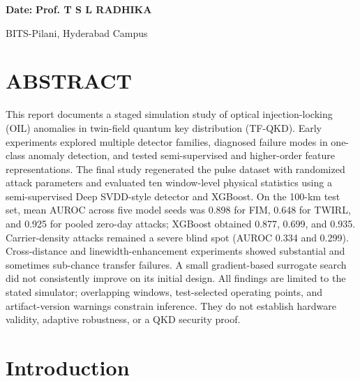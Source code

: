 \documentclass[12pt, a4paper]{report}
\begin{document}
\vspace{4cm}

\noindent \textbf{Date:} \hfill \textbf{Prof. T S L RADHIKA}

\vspace{2cm}

\noindent BITS-Pilani, Hyderabad Campus

\chapter*{ABSTRACT}

This report documents a staged simulation study of optical injection-locking (OIL) anomalies in twin-field quantum key distribution (TF-QKD). Early experiments explored multiple detector families, diagnosed failure modes in one-class anomaly detection, and tested semi-supervised and higher-order feature representations. The final study regenerated the pulse dataset with randomized attack parameters and evaluated ten window-level physical statistics using a semi-supervised Deep SVDD-style detector and XGBoost. On the 100-km test set, mean AUROC across five model seeds was 0.898 for FIM, 0.648 for TWIRL, and 0.925 for pooled zero-day attacks; XGBoost obtained 0.877, 0.699, and 0.935. Carrier-density attacks remained a severe blind spot (AUROC 0.334 and 0.299). Cross-distance and linewidth-enhancement experiments showed substantial and sometimes sub-chance transfer failures. A small gradient-based surrogate search did not consistently improve on its initial design. All findings are limited to the stated simulator; overlapping windows, test-selected operating points, and artifact-version warnings constrain inference. They do not establish hardware validity, adaptive robustness, or a QKD security proof.
\tableofcontents
\newpage

\chapter{Introduction}
\end{document}
